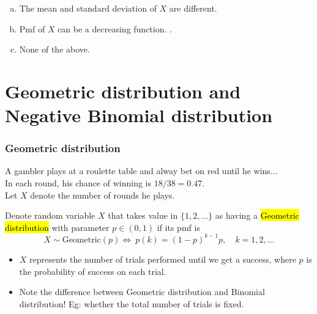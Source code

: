 \documentclass[slidestop,compress,mathserif]{beamer}
\begin{document}

\begin{frame}\frametitle{}


\begin{enumerate}[(a)]
\item The mean and standard deviation of $X$ are different.
\item Pmf of $X$ can be a decreasing function.
.
\item None of the above.
\end{enumerate}


\end{frame}


\section{Geometric distribution and Negative Binomial distribution}

\begin{frame}\frametitle{Geometric distribution}

A gambler plays at a roulette table and alway bet on red until he wins...\\
In each round, his chance of winning is $18/38 = 0.47$.\\
Let $X$ denote the number of rounds he plays.

\begin{defn}
Denote random variable $X$ that takes value in $\{1, 2, \ldots\}$ as having a \hl{Geometric distribution}
 with parameter $p \in (0, 1)$ if its pmf is
\[ X \sim \text{Geometric}(p) \Longleftrightarrow\ p(k) = (1-p)^{k-1}p,\quad k = 1, 2, \ldots \]
\end{defn}

\begin{itemize}
\item $X$ represents the number of trials performed until we get a success, where $p$ is the probability of success on each trial.

\item Note the difference between Geometric distribution and Binomial distribution!
Eg: whether the total number of trials is fixed.
\end{itemize}

\end{frame}
\end{document}
